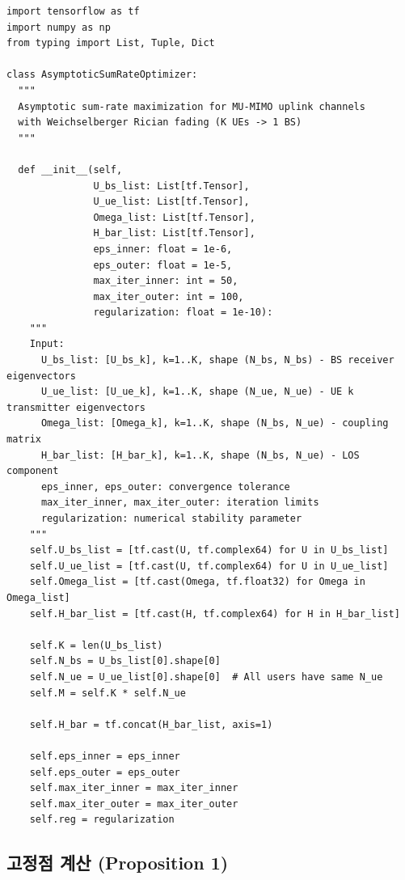 \documentclass[10pt]{article}
\begin{document}
\begin{lstlisting}[caption={AsymptoticSumRateOptimizer Class}]
import tensorflow as tf
import numpy as np
from typing import List, Tuple, Dict

class AsymptoticSumRateOptimizer:
  """
  Asymptotic sum-rate maximization for MU-MIMO uplink channels
  with Weichselberger Rician fading (K UEs -> 1 BS)
  """
  
  def __init__(self, 
               U_bs_list: List[tf.Tensor],
               U_ue_list: List[tf.Tensor],
               Omega_list: List[tf.Tensor],
               H_bar_list: List[tf.Tensor],
               eps_inner: float = 1e-6,
               eps_outer: float = 1e-5,
               max_iter_inner: int = 50,
               max_iter_outer: int = 100,
               regularization: float = 1e-10):
    """
    Input:
      U_bs_list: [U_bs_k], k=1..K, shape (N_bs, N_bs) - BS receiver eigenvectors
      U_ue_list: [U_ue_k], k=1..K, shape (N_ue, N_ue) - UE k transmitter eigenvectors
      Omega_list: [Omega_k], k=1..K, shape (N_bs, N_ue) - coupling matrix
      H_bar_list: [H_bar_k], k=1..K, shape (N_bs, N_ue) - LOS component
      eps_inner, eps_outer: convergence tolerance
      max_iter_inner, max_iter_outer: iteration limits
      regularization: numerical stability parameter
    """
    self.U_bs_list = [tf.cast(U, tf.complex64) for U in U_bs_list]
    self.U_ue_list = [tf.cast(U, tf.complex64) for U in U_ue_list]
    self.Omega_list = [tf.cast(Omega, tf.float32) for Omega in Omega_list]
    self.H_bar_list = [tf.cast(H, tf.complex64) for H in H_bar_list]
    
    self.K = len(U_bs_list)
    self.N_bs = U_bs_list[0].shape[0]
    self.N_ue = U_ue_list[0].shape[0]  # All users have same N_ue
    self.M = self.K * self.N_ue
    
    self.H_bar = tf.concat(H_bar_list, axis=1)
    
    self.eps_inner = eps_inner
    self.eps_outer = eps_outer
    self.max_iter_inner = max_iter_inner
    self.max_iter_outer = max_iter_outer
    self.reg = regularization
\end{lstlisting}

\subsection{고정점 계산 (Proposition 1)}
\end{document}
